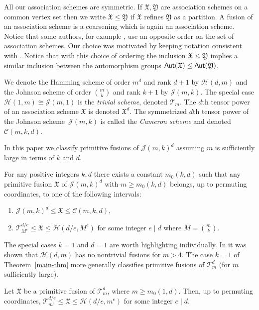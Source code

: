 \documentclass[ALCO]{cedram}
\newcommand {\Aut}[1]{{\sf Aut}({#1})}
\newcommand{\cT}{{\mathcal T}}
\newcommand{\cC}{{\mathcal C}}
\newcommand{\cH}{{\mathcal H}}
\newcommand{\cJ}{{\mathcal J}}
\def\X{\mathfrak{X}}
\def\Y{\mathfrak{Y}}
\def\T{\mathcal{T}}
\newcommand{\cT}{{\mathcal T}}
\newcommand{\cH}{{\mathcal H}}
\begin{document}
All our association schemes are symmetric.
If $\X, \Y$ are association schemes on a common vertex set then we write $\X \le \Y$ if $\X$ refines $\Y$ as a partition.
A fusion of an association scheme is a coarsening which is again an association scheme.
{Notice that some authors, for example \cite{KK}, use an opposite order on the set of association schemes. Our choice was motivated by keeping notation consistent with \cite{B,E}. Notice that with this choice of ordering the inclusion $\X \le \Y$ implies a similar inclusion between the automorphism groups $\Aut{\X}\le \Aut{\Y}$.}

We denote the Hamming scheme of order $m^d$ and rank $d+1$ by $\cH(d, m)$
and the Johnson scheme of order $\binom{m}{k}$ and rank $k+1$ by $\cJ(m, k)$.
The special case $\cH(1, m) \cong \cJ(m, 1)$ is the \emph{trivial scheme}, denoted $\cT_m$.
The $d$th tensor power of an association scheme $\X$ is denoted $\X^d$.
The symmetrized $d$th tensor power of the Johnson scheme~$\cJ(m, k)$ is called the \emph{Cameron scheme} and denoted $\cC(m, k, d)$.

In this paper we classify primitive fusions of $\cJ(m, k)^d$ assuming $m$ is sufficiently large in terms of $k$ and $d$.


\begin{theorem}
    \label{main-thm}
    {For any positive integers $k,d$ there exists a constant $m_0(k,d)$ such that
    any primitive fusion $\X$ of $\cJ(m, k)^d$ with $m \geq m_0(k, d)$ belongs, up to permuting coordinates, to one of the following intervals:
    \begin{enumerate}
        \item $\cJ(m, k)^d \leq \X \leq \cC(m, k, d)$,  
        \item $\T_{M^e}^{d/e} \leq \X \leq \cH(d/e, M^e)$ for some integer $e \mid d$ where $M=\binom{m}{k}$.
    \end{enumerate}
    }
\end{theorem}

The special cases $k = 1$ and $d = 1$ are worth highlighting individually.
In \cite{M-hamming} it was shown that $\cH(d, m)$ has no nontrivial fusions for $m > 4$. The case $k=1$ of Theorem~\ref{main-thm} more generally classifies primitive fusions of $\T_m^d$ (for $m$ sufficiently large).

\begin{cor}
    Let $\X$ be a primitive fusion of $\T_m^d$, where $m \geq m_0(1,d)$.
    Then, up to permuting coordinates, $\T_{m^e}^{d/e} \le \X \le \cH(d/e, m^e)$
    for some integer $e \mid d$.
\end{cor}
\end{document}
